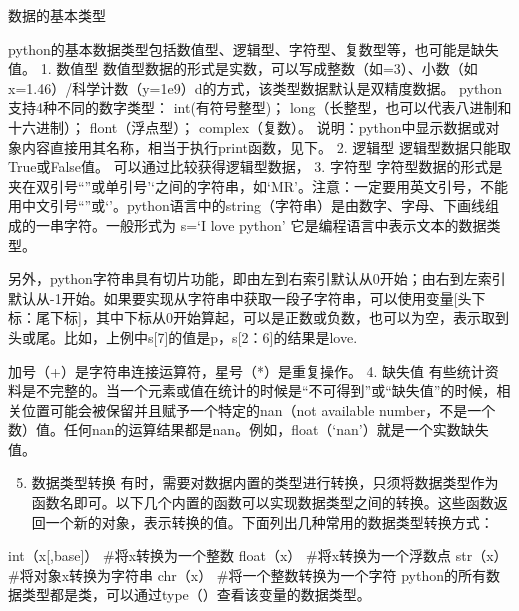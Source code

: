 \documentclass[ignorenonframetext,11pt,xcolor=dvipsnames,aspectratio=1610,hyperref={bookmarksdepth=4}]{beamer}
\providecommand{\tightlist}{%
  \setlength{\itemsep}{0pt}\setlength{\parskip}{0pt}}
\begin{document}
\begin{frame}{数据的基本类型}
\protect\hypertarget{section}{}

python的基本数据类型包括数值型、逻辑型、字符型、复数型等，也可能是缺失值。
1. 数值型
数值型数据的形式是实数，可以写成整数（如=3）、小数（如x=1.46）/科学计数（y=1e9）d的方式，该类型数据默认是双精度数据。
python支持4种不同的数字类型： int(有符号整型)；
long（长整型，也可以代表八进制和十六进制）； flont（浮点型）；
complex（复数）。
说明：python中显示数据或对象内容直接用其名称，相当于执行print函数，见下。
2. 逻辑型 逻辑型数据只能取True或False值。 可以通过比较获得逻辑型数据，
3. 字符型
字符型数据的形式是夹在双引号``''或单引号'`之间的字符串，如`MR'。注意：一定要用英文引号，不能用中文引号``''或`'。python语言中的string（字符串）是由数字、字母、下画线组成的一串字符。一般形式为
s=`I love python' 它是编程语言中表示文本的数据类型。

另外，python字符串具有切片功能，即由左到右索引默认从0开始；由右到左索引默认从-1开始。如果要实现从字符串中获取一段子字符串，可以使用变量{[}头下标：尾下标{]}，其中下标从0开始算起，可以是正数或负数，也可以为空，表示取到头或尾。比如，上例中s{[}7{]}的值是p，s{[}2：6{]}的结果是love.

加号（+）是字符串连接运算符，星号（*）是重复操作。 4. 缺失值
有些统计资料是不完整的。当一个元素或值在统计的时候是``不可得到''或``缺失值''的时候，相关位置可能会被保留并且赋予一个特定的nan（not
available
number，不是一个数）值。任何nan的运算结果都是nan。例如，float（`nan'）就是一个实数缺失值。

\begin{enumerate}
\setcounter{enumi}{4}
\tightlist
\item
  数据类型转换
  有时，需要对数据内置的类型进行转换，只须将数据类型作为函数名即可。以下几个内置的函数可以实现数据类型之间的转换。这些函数返回一个新的对象，表示转换的值。下面列出几种常用的数据类型转换方式：
\end{enumerate}

int（x{[},base{]}） \#将x转换为一个整数 float（x） \#将x转换为一个浮数点
str（x） \#将对象x转换为字符串 chr（x） \#将一个整数转换为一个字符
python的所有数据类型都是类，可以通过type（）查看该变量的数据类型。

\end{frame}
\end{document}
